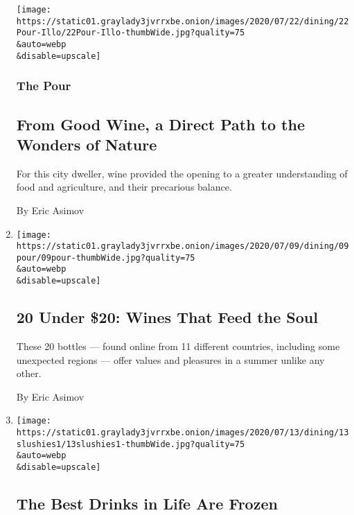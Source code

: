 \begin{enumerate}
  \texttt{[image: https://static01.graylady3jvrrxbe.onion/images/2020/07/22/dining/22Pour-Illo/22Pour-Illo-thumbWide.jpg?quality=75\\\&auto=webp\\\&disable=upscale]}

  \hypertarget{the-pour-4}{%
  \subsubsection{The Pour}\label{the-pour-4}}

  \hypertarget{from-good-wine-a-direct-path-to-the-wonders-of-nature}{%
  \subsection{From Good Wine, a Direct Path to the Wonders of
  Nature}\label{from-good-wine-a-direct-path-to-the-wonders-of-nature}}

  For this city dweller, wine provided the opening to a greater
  understanding of food and agriculture, and their precarious balance.

  By Eric Asimov
\item
  \href{/2020/07/10/dining/drinks/best-wines-under-20-dollars-pandemic.html}{}

  \texttt{[image: https://static01.graylady3jvrrxbe.onion/images/2020/07/09/dining/09pour/09pour-thumbWide.jpg?quality=75\\\&auto=webp\\\&disable=upscale]}

  \hypertarget{20-under-20-wines-that-feed-the-soul}{%
  \subsection{20 Under \$20: Wines That Feed the
  Soul}\label{20-under-20-wines-that-feed-the-soul}}

  These 20 bottles --- found online from 11 different countries,
  including some unexpected regions --- offer values and pleasures in a
  summer unlike any other.

  By Eric Asimov
\item
  \href{/2020/07/10/dining/drinks/frozen-drink-recipes.html}{}

  \texttt{[image: https://static01.graylady3jvrrxbe.onion/images/2020/07/13/dining/13slushies1/13slushies1-thumbWide.jpg?quality=75\\\&auto=webp\\\&disable=upscale]}

  \hypertarget{the-best-drinks-in-life-are-frozen}{%
  \subsection{The Best Drinks in Life Are
  Frozen}\label{the-best-drinks-in-life-are-frozen}}


\end{enumerate}

